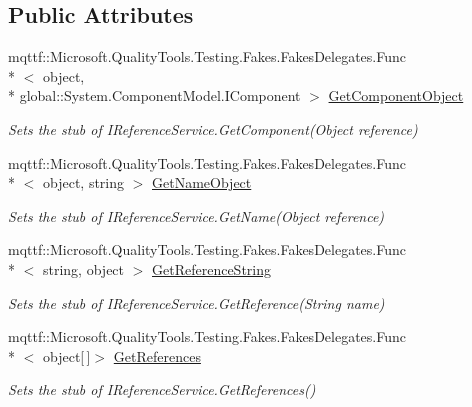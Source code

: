 \subsection*{Public Attributes}
\begin{DoxyCompactItemize}
\item 
mqttf\-::\-Microsoft.\-Quality\-Tools.\-Testing.\-Fakes.\-Fakes\-Delegates.\-Func\\*
$<$ object, \\*
global\-::\-System.\-Component\-Model.\-I\-Component $>$ \hyperlink{class_system_1_1_component_model_1_1_design_1_1_fakes_1_1_stub_i_reference_service_a63856a59deec8d19a340467b2be38812}{Get\-Component\-Object}
\begin{DoxyCompactList}\small\item\em Sets the stub of I\-Reference\-Service.\-Get\-Component(\-Object reference)\end{DoxyCompactList}\item 
mqttf\-::\-Microsoft.\-Quality\-Tools.\-Testing.\-Fakes.\-Fakes\-Delegates.\-Func\\*
$<$ object, string $>$ \hyperlink{class_system_1_1_component_model_1_1_design_1_1_fakes_1_1_stub_i_reference_service_a1f291b4f350da0d1f20a7791a44acfe2}{Get\-Name\-Object}
\begin{DoxyCompactList}\small\item\em Sets the stub of I\-Reference\-Service.\-Get\-Name(\-Object reference)\end{DoxyCompactList}\item 
mqttf\-::\-Microsoft.\-Quality\-Tools.\-Testing.\-Fakes.\-Fakes\-Delegates.\-Func\\*
$<$ string, object $>$ \hyperlink{class_system_1_1_component_model_1_1_design_1_1_fakes_1_1_stub_i_reference_service_a7cacca4388e5e59ac8f69bdf3e02aa0c}{Get\-Reference\-String}
\begin{DoxyCompactList}\small\item\em Sets the stub of I\-Reference\-Service.\-Get\-Reference(\-String name)\end{DoxyCompactList}\item 
mqttf\-::\-Microsoft.\-Quality\-Tools.\-Testing.\-Fakes.\-Fakes\-Delegates.\-Func\\*
$<$ object\mbox{[}$\,$\mbox{]}$>$ \hyperlink{class_system_1_1_component_model_1_1_design_1_1_fakes_1_1_stub_i_reference_service_ad3c8717253a2f5a681fe8fd483038519}{Get\-References}
\begin{DoxyCompactList}\small\item\em Sets the stub of I\-Reference\-Service.\-Get\-References()\end{DoxyCompactList}\item 

\end{DoxyCompactItemize}
